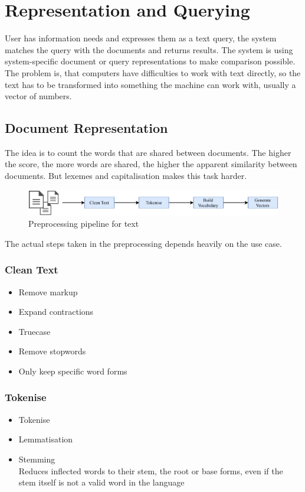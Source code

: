 \documentclass[11pt]{article}
\begin{document}
\section{Representation and Querying}
User has information needs and expresses them as a text query, the system matches the query with the documents and returns results. The system is using system-specific document or query representations to make comparison possible. The problem is, that computers have difficulties to work with text directly, so the text has to be transformed into something the machine can work with, usually a vector of numbers.

\subsection{Document Representation}
The idea is to count the words that are shared between documents. The higher the score, the more words are shared, the higher the apparent similarity between documents. But lexemes and capitalisation makes this task harder.
\begin{figure}[H]
	\centering
	\includegraphics[width=0.8\linewidth]{img/preprocessing_pipeline}
	\caption{Preprocessing pipeline for text}
	\label{fig:preprocessingpipeline}
\end{figure}
The actual steps taken in the preprocessing depends heavily on the use case.

\subsubsection{Clean Text}
\begin{itemize}[noitemsep]
	\item Remove markup
	\item Expand contractions
	\item Truecase
	\item Remove stopwords
	\item Only keep specific word forms
\end{itemize}

\subsubsection{Tokenise}
\begin{itemize}[noitemsep]
	\item Tokenise
	\item Lemmatisation
	\item Stemming\\
	Reduces inflected words to their stem, the root or base forms, even if the stem itself is not a valid word in the language
\end{itemize}
\end{document}

